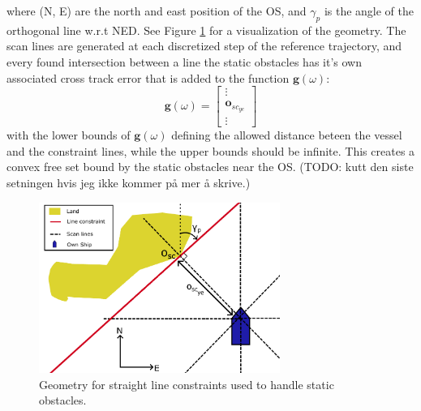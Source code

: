 where (N, E) are the north and east position of the \gls{OS}, and $\gamma_p$ is the angle of the orthogonal line w.r.t NED.
See Figure \ref{FIG: static_obs_ex} for a visualization of the geometry.
The scan lines are generated at each discretized step of the reference trajectory, and every found intersection between a 
line the static obstacles has it's own associated cross track error that is added to the function $\textbf{g}(\omega)$:
\begin{equation}
    \textbf{g}(\omega) = \begin{bmatrix}
        \vdots \\
        \mathbf{o}_{sc_{ye}} \\
        \vdots
    \end{bmatrix}
\end{equation}
with the lower bounds of $\textbf{g}(\omega)$ defining the allowed distance beteen the vessel and the constraint lines, while the upper bounds
should be infinite. This creates a convex free set bound by the static obstacles near the \gls{OS}. 
(TODO: kutt den siste setningen hvis jeg ikke kommer på mer å skrive.)

\begin{figure}[bh!]
    \centering
    \includegraphics[width=0.7\textwidth]{Images/StaticObs_example.pdf}
    \caption{Geometry for straight line constraints used to handle static obstacles.}
    \label{FIG: static_obs_ex}
\end{figure}


